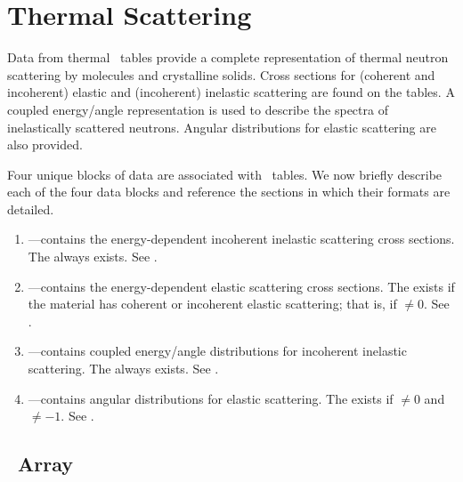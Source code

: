 \section[Thermal Scattering]{Thermal Scattering \SaB}\label{sec:ThermalScattering}

Data from thermal \SaB\ tables provide a complete representation of thermal neutron scattering by molecules and crystalline solids. Cross sections for (coherent and incoherent) elastic and (incoherent) inelastic scattering are found on the tables. A coupled energy/angle representation is used to describe the spectra of inelastically scattered neutrons. Angular distributions for elastic scattering are also provided.

Four unique blocks of data are associated with \SaB\ tables. We now briefly describe each of the four data blocks and reference the sections in which their formats are detailed.

\begin{enumerate}
  \item \textbf{}---contains the energy-dependent incoherent inelastic scattering cross sections. The   always exists. See .
  \item \textbf{}---contains the energy-dependent elastic scattering cross sections. The  exists if the material has coherent or incoherent elastic scattering; that is, if $\neq0$. See .
  \item \textbf{}---contains coupled energy/angle distributions for incoherent inelastic scattering. The  always exists. See .
  \item \textbf{}---contains angular distributions for elastic scattering. The  exists if $\neq0$ and $\neq-1$. See .
\end{enumerate}

\subsection{\NXS\ Array}\label{sec:NXSThermalScattering}

